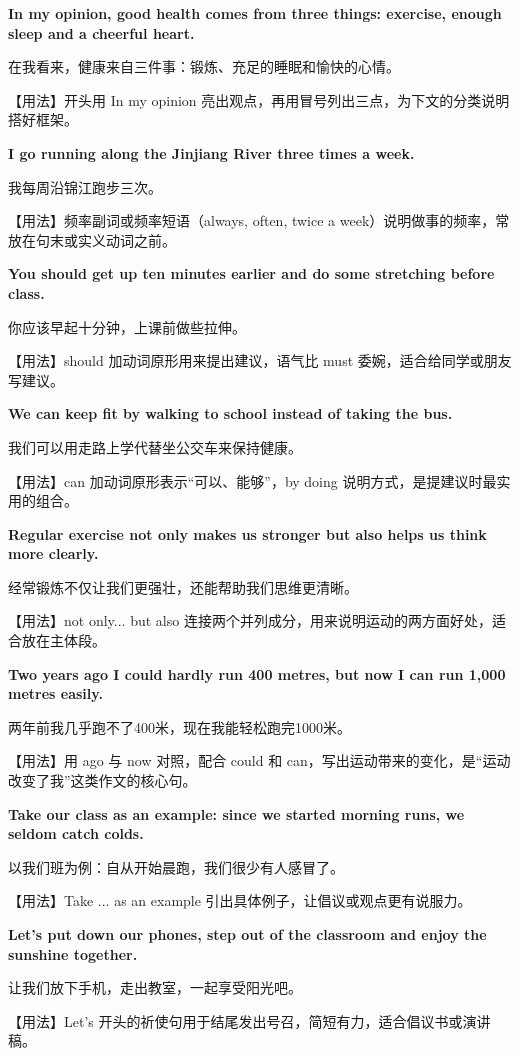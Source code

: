 \documentclass[UTF8,a4paper,11pt,oneside]{ctexbook}
\newcommand{\fansection}[1]{%
  \par\addvspace{2.4ex}%
  \Needspace{6\baselineskip}%
  \noindent{\sffamily\Large\bfseries\color{mainblue}#1}\par
  \nopagebreak
  \addvspace{0.2ex}%
  \noindent{\color{rulelight}\rule{\linewidth}{0.9pt}}\par
  \addvspace{0.9ex}%
  \nobreak
}
\newcommand{\fanpat}[3]{%
  \item{\bfseries #1}\par\nopagebreak
  {\small\color{textgray}#2}\par\nopagebreak
  {\footnotesize\color{accent!90!black}【用法】#3}\par
}
\begin{document}
\fansection{〇、本单元写作常用句型}
\begin{fanpatterns}
\fanpat{In my opinion, good health comes from three things: exercise, enough sleep and a cheerful heart.}{在我看来，健康来自三件事：锻炼、充足的睡眠和愉快的心情。}{开头用 In my opinion 亮出观点，再用冒号列出三点，为下文的分类说明搭好框架。}

\fanpat{I go running along the Jinjiang River three times a week.}{我每周沿锦江跑步三次。}{频率副词或频率短语（always, often, twice a week）说明做事的频率，常放在句末或实义动词之前。}

\fanpat{You should get up ten minutes earlier and do some stretching before class.}{你应该早起十分钟，上课前做些拉伸。}{should 加动词原形用来提出建议，语气比 must 委婉，适合给同学或朋友写建议。}

\fanpat{We can keep fit by walking to school instead of taking the bus.}{我们可以用走路上学代替坐公交车来保持健康。}{can 加动词原形表示“可以、能够”，by doing 说明方式，是提建议时最实用的组合。}

\fanpat{Regular exercise not only makes us stronger but also helps us think more clearly.}{经常锻炼不仅让我们更强壮，还能帮助我们思维更清晰。}{not only... but also 连接两个并列成分，用来说明运动的两方面好处，适合放在主体段。}

\fanpat{Two years ago I could hardly run 400 metres, but now I can run 1,000 metres easily.}{两年前我几乎跑不了400米，现在我能轻松跑完1000米。}{用 ago 与 now 对照，配合 could 和 can，写出运动带来的变化，是“运动改变了我”这类作文的核心句。}

\fanpat{Take our class as an example: since we started morning runs, we seldom catch colds.}{以我们班为例：自从开始晨跑，我们很少有人感冒了。}{Take ... as an example 引出具体例子，让倡议或观点更有说服力。}

\fanpat{Let's put down our phones, step out of the classroom and enjoy the sunshine together.}{让我们放下手机，走出教室，一起享受阳光吧。}{Let's 开头的祈使句用于结尾发出号召，简短有力，适合倡议书或演讲稿。}

\end{fanpatterns}

\fansection{一、满分范文}
\end{document}
